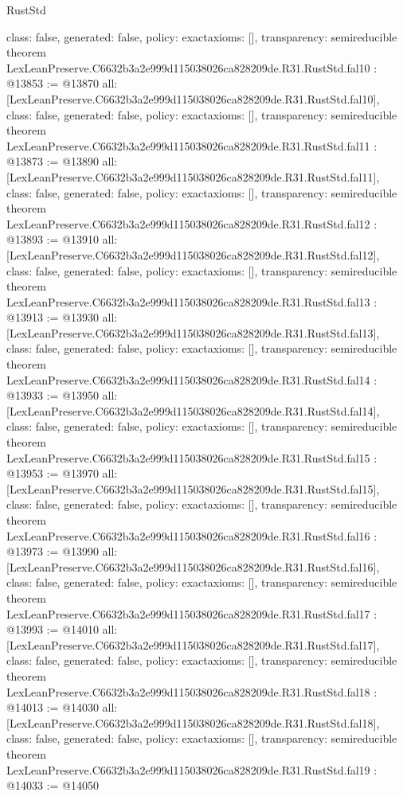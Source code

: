 \begin{lexlean}{RustStd}
\begin{coremodule}
{  class: false,
  generated: false,
  policy: exact{axioms: []},
  transparency: semireducible
}
theorem LexLeanPreserve.C6632b3a2e999d115038026ca828209de.R31.RustStd.fal10 : @13853 := @13870 {
  all: [LexLeanPreserve.C6632b3a2e999d115038026ca828209de.R31.RustStd.fal10],
  class: false,
  generated: false,
  policy: exact{axioms: []},
  transparency: semireducible
}
theorem LexLeanPreserve.C6632b3a2e999d115038026ca828209de.R31.RustStd.fal11 : @13873 := @13890 {
  all: [LexLeanPreserve.C6632b3a2e999d115038026ca828209de.R31.RustStd.fal11],
  class: false,
  generated: false,
  policy: exact{axioms: []},
  transparency: semireducible
}
theorem LexLeanPreserve.C6632b3a2e999d115038026ca828209de.R31.RustStd.fal12 : @13893 := @13910 {
  all: [LexLeanPreserve.C6632b3a2e999d115038026ca828209de.R31.RustStd.fal12],
  class: false,
  generated: false,
  policy: exact{axioms: []},
  transparency: semireducible
}
theorem LexLeanPreserve.C6632b3a2e999d115038026ca828209de.R31.RustStd.fal13 : @13913 := @13930 {
  all: [LexLeanPreserve.C6632b3a2e999d115038026ca828209de.R31.RustStd.fal13],
  class: false,
  generated: false,
  policy: exact{axioms: []},
  transparency: semireducible
}
theorem LexLeanPreserve.C6632b3a2e999d115038026ca828209de.R31.RustStd.fal14 : @13933 := @13950 {
  all: [LexLeanPreserve.C6632b3a2e999d115038026ca828209de.R31.RustStd.fal14],
  class: false,
  generated: false,
  policy: exact{axioms: []},
  transparency: semireducible
}
theorem LexLeanPreserve.C6632b3a2e999d115038026ca828209de.R31.RustStd.fal15 : @13953 := @13970 {
  all: [LexLeanPreserve.C6632b3a2e999d115038026ca828209de.R31.RustStd.fal15],
  class: false,
  generated: false,
  policy: exact{axioms: []},
  transparency: semireducible
}
theorem LexLeanPreserve.C6632b3a2e999d115038026ca828209de.R31.RustStd.fal16 : @13973 := @13990 {
  all: [LexLeanPreserve.C6632b3a2e999d115038026ca828209de.R31.RustStd.fal16],
  class: false,
  generated: false,
  policy: exact{axioms: []},
  transparency: semireducible
}
theorem LexLeanPreserve.C6632b3a2e999d115038026ca828209de.R31.RustStd.fal17 : @13993 := @14010 {
  all: [LexLeanPreserve.C6632b3a2e999d115038026ca828209de.R31.RustStd.fal17],
  class: false,
  generated: false,
  policy: exact{axioms: []},
  transparency: semireducible
}
theorem LexLeanPreserve.C6632b3a2e999d115038026ca828209de.R31.RustStd.fal18 : @14013 := @14030 {
  all: [LexLeanPreserve.C6632b3a2e999d115038026ca828209de.R31.RustStd.fal18],
  class: false,
  generated: false,
  policy: exact{axioms: []},
  transparency: semireducible
}
theorem LexLeanPreserve.C6632b3a2e999d115038026ca828209de.R31.RustStd.fal19 : @14033 := @14050 {
}
\end{coremodule}
\end{lexlean}
